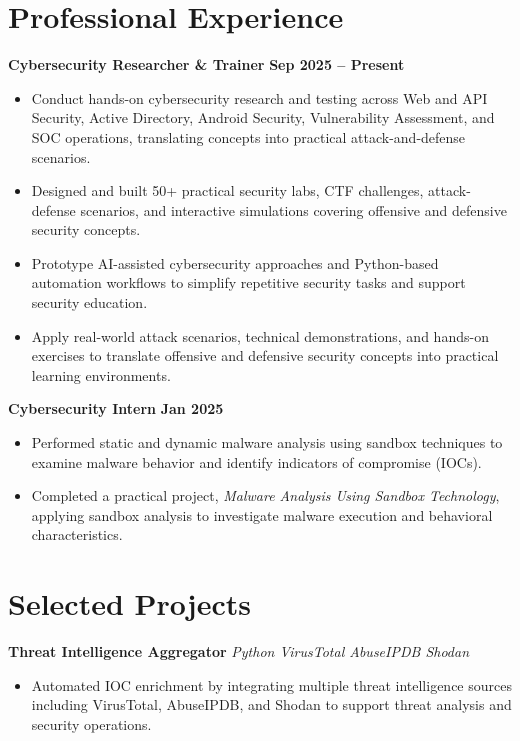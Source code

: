 \documentclass[10pt,a4paper]{article}
\newcommand{\resumeitem}[1]{\item #1}
\begin{document}
\section{Professional Experience}

\noindent\textbf{Cybersecurity Researcher \& Trainer} \hfill \textbf{Sep 2025 -- Present}\\
\begin{itemize}
\resumeitem{Conduct hands-on cybersecurity research and testing across Web and API Security, Active Directory, Android Security, Vulnerability Assessment, and SOC operations, translating concepts into practical attack-and-defense scenarios.}
\resumeitem{Designed and built 50+ practical security labs, CTF challenges, attack-defense scenarios, and interactive simulations covering offensive and defensive security concepts.}
\resumeitem{Prototype AI-assisted cybersecurity approaches and Python-based automation workflows to simplify repetitive security tasks and support security education.}
\resumeitem{Apply real-world attack scenarios, technical demonstrations, and hands-on exercises to translate offensive and defensive security concepts into practical learning environments.}
\end{itemize}

\vspace{2pt}
\noindent\textbf{Cybersecurity Intern} \hfill \textbf{Jan 2025}\\
\begin{itemize}
\resumeitem{Performed static and dynamic malware analysis using sandbox techniques to examine malware behavior and identify indicators of compromise (IOCs).}
\resumeitem{Completed a practical project, \textit{Malware Analysis Using Sandbox Technology}, applying sandbox analysis to investigate malware execution and behavioral characteristics.}
\end{itemize}

\section{Selected Projects}

\noindent\textbf{Threat Intelligence Aggregator} \hfill {\fontsize{8.5}{10}\selectfont\textit{Python \textbar{} VirusTotal \textbar{} AbuseIPDB \textbar{} Shodan}}\\
\begin{itemize}
\resumeitem{Automated IOC enrichment by integrating multiple threat intelligence sources including VirusTotal, AbuseIPDB, and Shodan to support threat analysis and security operations.}
\end{itemize}
\end{document}
